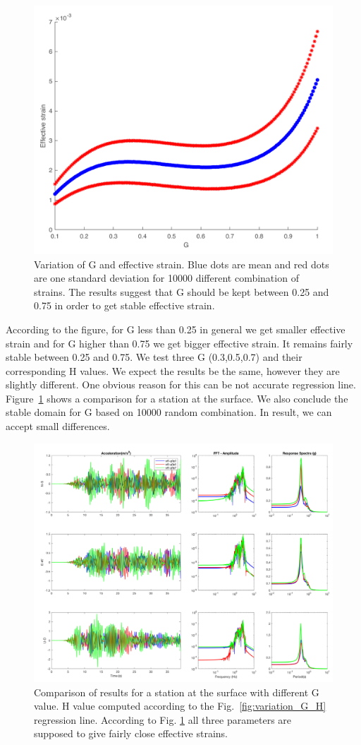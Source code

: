  \begin{figure}[H]
    \centering
    \includegraphics[width=300 px]{figures/pdf/Gh_sensitivity_plot.pdf}
    \caption{Variation of G and effective strain. Blue dots are mean and red dots are one standard deviation for 10000 different combination of strains. The results suggest that G should be kept between 0.25 and 0.75 in order to get stable effective strain.}
    \label{fig:Gh_sensitivity_plot}
\end{figure}

According to the figure, for G less than 0.25 in general we get smaller effective strain and for G higher than 0.75 we get bigger effective strain. It remains fairly stable between 0.25 and 0.75.  We test three G (0.3,0.5,0.7) and their corresponding H values. We expect the results be the same, however they are slightly different. One obvious reason for this can be not accurate regression line. Figure~\ref{fig:Gh_sensitivity_plot} shows a comparison for a station at the surface. We also conclude the stable domain for G based on 10000 random combination. In result, we can accept small differences. 

 \begin{figure}[H]
    \centering
    \includegraphics[width=300 px]{figures/pdf/GH_var_test_station_surface_middle_basin.pdf}
    \caption{Comparison of results for a station at the surface with different G value. H value computed according to the Fig.~\ref{fig:variation_G_H} regression line. According to Fig. \ref{fig:Gh_sensitivity_plot} all three parameters are supposed to give fairly close effective strains. }
    \label{fig:GH_var_test_station_surface_middle_basin}
\end{figure}















